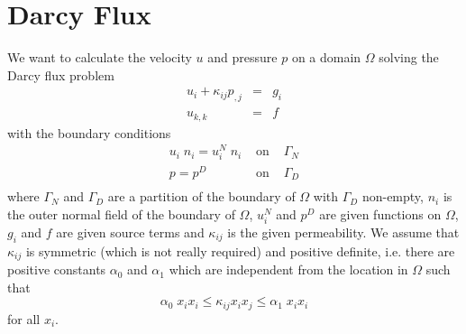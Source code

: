 
%
%
%

\section{Darcy Flux}
\label{DARCY FLUX}
We want to calculate the velocity $u$ and pressure $p$ on a domain $\Omega$
solving the Darcy flux problem
\begin{equation}\label{DARCY PROBLEM}
\begin{array}{rcl}
u_{i} + \kappa_{ij} p_{,j} & = & g_{i} \\
u_{k,k} & = & f
\end{array}
\end{equation} 
with the boundary conditions
\begin{equation}\label{DARCY BOUNDARY}
\begin{array}{rcl}
u_{i} \; n_{i}  = u^{N}_{i}  \; n_{i} & \mbox{ on } & \Gamma_{N} \\
p = p^{D} &  \mbox{ on } & \Gamma_{D} \\ 
\end{array}
\end{equation} 
where $\Gamma_{N}$ and $\Gamma_{D}$ are a partition of the boundary of
$\Omega$ with $\Gamma_{D}$ non-empty, $n_{i}$ is the outer normal field of the
boundary of $\Omega$, $u^{N}_{i}$ and $p^{D}$ are given functions on $\Omega$,
$g_{i}$ and $f$ are given source terms and $\kappa_{ij}$ is the given
permeability.
We assume that $\kappa_{ij}$ is symmetric (which is not really required) and
positive definite, i.e. there are positive constants $\alpha_{0}$ and
$\alpha_{1}$ which are independent from the location in $\Omega$ such that
\begin{equation}
\alpha_{0} \; x_{i} x_{i} \le \kappa_{ij} x_{i} x_{j} \le \alpha_{1} \; x_{i} x_{i}
\end{equation}
for all $x_{i}$.

